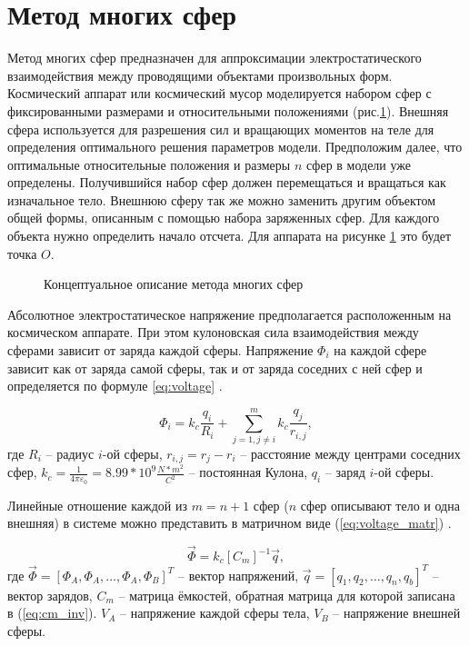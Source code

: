 \section{Метод многих сфер}
\label{sec:msm}

Метод многих сфер предназначен для аппроксимации электростатического взаимодействия между проводящими объектами произвольных форм.
Космический аппарат или космический мусор моделируется набором сфер с фиксированными размерами и относительными положениями (рис.\ref{ris:sp_msm}).
Внешняя сфера используется для разрешения сил и вращающих моментов на теле для определения оптимального решения параметров модели.
Предположим далее, что оптимальные относительные положения и размеры $n$ сфер в модели уже определены.
Получившийся набор сфер должен перемещаться и вращаться как изначальное тело.
Внешнюю сферу так же можно заменить другим объектом общей формы, описанным с помощью набора заряженных сфер.
Для каждого объекта нужно определить начало отсчета. Для аппарата на рисунке \ref{ris:sp_msm} это будет точка $O$. 

\begin{figure}[H]
	\caption{Концептуальное описание метода многих сфер}
	\label{ris:sp_msm}
\end{figure}

Абсолютное электростатическое напряжение предполагается расположенным на космическом аппарате.
При этом кулоновская сила взаимодействия между сферами зависит от заряда каждой сферы.
Напряжение $\Phi_i$ на каждой сфере зависит как от заряда самой сферы, так и от заряда соседних с ней сфер и определяется по формуле \ref{eq:voltage} \cite{2sph}.

\begin{equation}
\label{eq:voltage}
	\Phi_i = k_c \frac{q_i}{R_i} + \sum_{j=1,j\neq i}^{m} k_c \frac{q_j}{r_{i,j}},
\end{equation}
где $R_i$ – радиус $i$-ой сферы, $r_{i,j} = r_j - r_i$ – расстояние между центрами соседних сфер, $k_c = \frac{1}{4\pi\varepsilon_0} = 8.99 * 10^9 \frac{N*m^2}{C^2}$ – постоянная Кулона, $q_i$ – заряд $i$-ой сферы.

Линейные отношение каждой из $m = n + 1$ сфер ($n$ сфер описывают тело и одна внешняя) в системе можно представить в матричном виде (\ref{eq:voltage_matr}) \cite{msm}.

\begin{equation}
\label{eq:voltage_matr}
	\vec{\Phi} = k_c [C_m]^{-1} \vec{q},
\end{equation}
где $\vec{\Phi} = [\Phi_A, \Phi_A, \dots, \Phi_A, \Phi_B]^T$ – вектор напряжений, $\vec{q} = [q_1, q_2, \dots, q_n, q_b]^T$ – вектор зарядов, $C_m$ – матрица ёмкостей, обратная матрица для которой записана в (\ref{eq:cm_inv}).
$V_A$ – напряжение каждой сферы тела, $V_B$ – напряжение внешней сферы.

